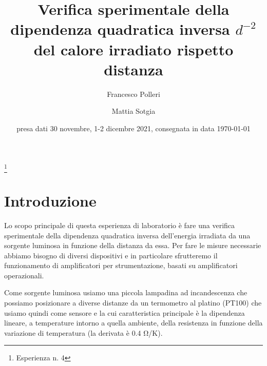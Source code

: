 \documentclass[
    rmp,
    reprint, 
    superscriptaddress, 
    altaffilletter, 
    amsmath, 
    amssymb,
    a4paper]{revtex4-2}
\begin{document}
\title{Verifica sperimentale della dipendenza quadratica inversa $d^{-2}$ del calore irradiato rispetto distanza 
}
\thanks{Esperienza n. 4
}

\author{Francesco Polleri}
\author{Mattia Sotgia}


\date{presa dati
    30 novembre, 1-2 dicembre 2021, consegnata in data 
    \today
}

\begin{abstract}
    
\end{abstract}
\maketitle
\thispagestyle{fancy}


\section*{Introduzione}
Lo scopo principale di questa esperienza di laboratorio è fare una verifica sperimentale della dipendenza quadratica inversa dell'energia irradiata da una sorgente luminosa in funzione della distanza da essa.
Per fare le misure necessarie abbiamo bisogno di diversi dispositivi e in particolare sfrutteremo il funzionamento di amplificatori per strumentazione, basati su amplificatori operazionali.

Come sorgente luminosa usiamo una piccola lampadina ad incandescenza che possiamo posizionare a diverse distanze da un termometro al platino (PT100) che usiamo quindi come sensore e la cui caratteristica principale è la dipendenza lineare, a temperature intorno a quella ambiente, della resistenza in funzione della variazione di temperatura (la derivata è 0.4 \unit{\ohm/\kelvin}). 

\end{document}

